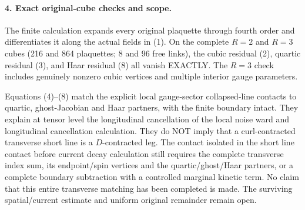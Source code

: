 \documentclass[11pt]{article}
\begin{document}
\paragraph{4. Exact original-cube checks and scope.}
The finite calculation
expands every original plaquette through fourth order and differentiates
it along the actual fields in (1). On the complete $R=2$ and $R=3$
cubes (216 and 864 plaquettes; 8 and 96 free links), the cubic residual
(2), quartic residual (3), and Haar residual (8) all vanish EXACTLY.
The $R=3$ check includes genuinely nonzero cubic vertices and multiple
interior gauge parameters.

Equations (4)--(8) match the explicit local gauge-sector collapsed-line
contacts to quartic, ghost-Jacobian and Haar partners, with the finite
boundary intact. They explain at tensor level the longitudinal
cancellation of the local noise ward and longitudinal cancellation calculation. They do NOT imply that a curl-contracted
transverse short line is a $D$-contracted leg. The contact isolated in the short line contact before current decay calculation
still requires the complete transverse index sum, its endpoint/spin
vertices and the quartic/ghost/Haar partners, or a
complete boundary subtraction with a controlled marginal kinetic term.
No claim that this entire transverse matching has been completed is
made. The surviving spatial/current estimate and uniform original
remainder remain open.
\end{document}

